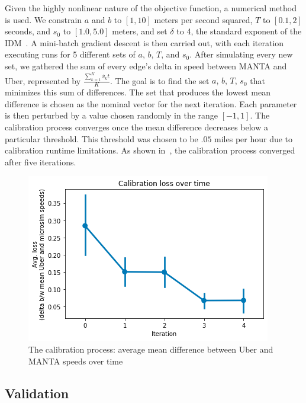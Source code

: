 \documentclass[final]{IEEEtran}
\begin{document}
Given the highly nonlinear nature of the objective function, a numerical method is used. We constrain $a$ and $b$ to $[1,10]$ meters per second squared, $T$ to $[0.1,2]$ seconds, and $s_0$ to $[1.0,5.0]$ meters, and set $\delta$ to 4, the standard exponent of the IDM~\cite{treiberTrafficFlowDynamics2013}. A mini-batch gradient descent is then carried out, with each iteration executing runs for 5 different sets of {$a$, $b$, $T$, and $s_0$}. After simulating every new set, we gathered the sum of every edge's delta in speed between MANTA and Uber, represented by $\frac{\sum_{k=1}^K{\dot{v_k}t}}{K}$. The goal is to find the set {$a$, $b$, $T$, $s_0$} that minimizes this sum of differences. The set that produces the lowest mean difference is chosen as the nominal vector for the next iteration. Each parameter is then perturbed by a value chosen randomly in the range $[-1,1]$. The calibration process converges once the mean difference decreases below a particular threshold. This threshold was chosen to be $.05$ miles per hour due to calibration runtime limitations. As shown in~, the calibration process converged after five iterations.

\begin{figure}
    \centering
    \includegraphics[width=.45\textwidth]{figs/calibration.png}
    \caption{The calibration process: average mean difference between Uber and MANTA speeds over time}
    \label{fig:calibration}
\end{figure}

\subsection{Validation}
\end{document}

